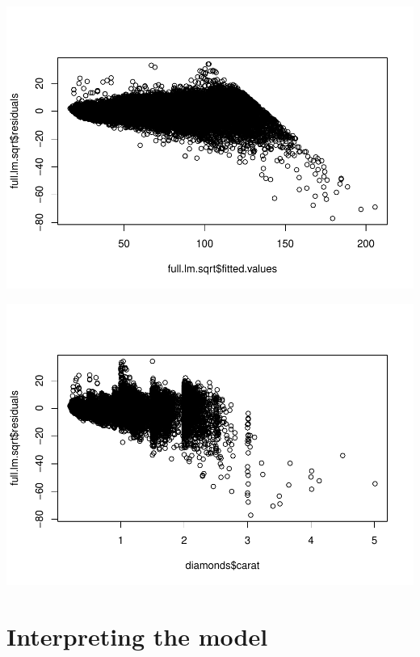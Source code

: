 \documentclass[
]{book}
\newenvironment{Shaded}{\begin{snugshade}}{\end{snugshade}}
\newcommand{\FunctionTok}[1]{\textcolor[rgb]{0.00,0.00,0.00}{#1}}
\newcommand{\NormalTok}[1]{#1}
\newcommand{\SpecialCharTok}[1]{\textcolor[rgb]{0.00,0.00,0.00}{#1}}
\begin{document}
\includegraphics{13-MultipleLinearRegression_files/figure-latex/unnamed-chunk-7-2.pdf}

\begin{Shaded}
\end{Shaded}

\includegraphics{13-MultipleLinearRegression_files/figure-latex/unnamed-chunk-7-3.pdf}

\hypertarget{interpreting-the-model}{%
\section{Interpreting the model}\label{interpreting-the-model}}
\end{document}
